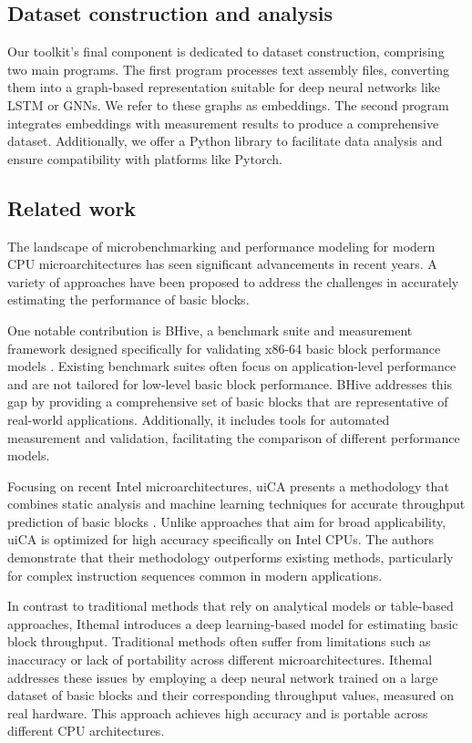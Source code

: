 \subsection{Dataset construction and analysis}

Our toolkit's final component is dedicated to dataset construction, comprising two main programs. 
The first program processes text assembly files, converting them into a graph-based representation 
suitable for deep neural networks like LSTM or GNNs. We refer to these graphs as embeddings. 
The second program integrates embeddings with measurement results to produce a comprehensive dataset. 
Additionally, we offer a Python library to facilitate data analysis and ensure compatibility with 
platforms like Pytorch.

\subsection{Related work}

The landscape of microbenchmarking and performance modeling for modern CPU microarchitectures has 
seen significant advancements in recent years. A variety of approaches have been proposed to address 
the challenges in accurately estimating the performance of basic blocks.

One notable contribution is BHive, a benchmark suite and measurement framework designed specifically 
for validating x86-64 basic block performance models \cite{chenBHiveBenchmarkSuite2019}. Existing 
benchmark suites often focus on application-level performance and are not tailored for low-level 
basic block performance. BHive addresses this gap by providing a comprehensive set of basic blocks 
that are representative of real-world applications. Additionally, it includes tools for automated 
measurement and validation, facilitating the comparison of different performance models.

Focusing on recent Intel microarchitectures, uiCA presents a methodology that combines static analysis
and machine learning techniques for accurate throughput prediction of basic 
blocks \cite{abelUiCAAccurateThroughput2022}. Unlike approaches that aim for broad applicability, 
uiCA is optimized for high accuracy specifically on Intel CPUs. The authors demonstrate that their 
methodology outperforms existing methods, particularly for complex instruction sequences common in 
modern applications.

In contrast to traditional methods that rely on analytical models or table-based approaches, Ithemal 
introduces a deep learning-based model for estimating basic block throughput. Traditional methods 
often suffer from limitations such as inaccuracy or lack of portability across different microarchitectures.
Ithemal addresses these issues by employing a deep neural network trained on a large dataset of basic
blocks and their corresponding throughput values, measured on real hardware. This approach achieves high 
accuracy and is portable across different CPU architectures.

